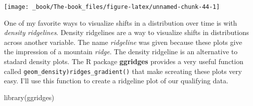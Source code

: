 \documentclass[
]{book}
\newenvironment{Shaded}{\begin{snugshade}}{\end{snugshade}}
\newcommand{\FunctionTok}[1]{\textcolor[rgb]{0.00,0.00,0.00}{#1}}
\newcommand{\NormalTok}[1]{#1}
\begin{document}
\begin{center}\texttt{[image: \_book/The-book\_files/figure-latex/unnamed-chunk-44-1]} \end{center}

One of my favorite ways to visualize shifts in a distribution over time is with \emph{density ridgelines}. Density ridgelines are a way to visualize shifts in distributions across another variable. The name \emph{ridgeline} was given because these plots give the impression of a mountain \emph{ridge}. The density ridgeline is an alternative to stadard density plots. The R package \textbf{ggridges} provides a very useful function called \texttt{geom\_density)ridges\_gradient()} that make screating these plots very easy. I'll use this function to create a ridgeline plot of our qualifying data.

\begin{Shaded}
\begin{Highlighting}[]
\FunctionTok{library}\NormalTok{(ggridges)}


\end{Highlighting}
\end{Shaded}
\end{document}
